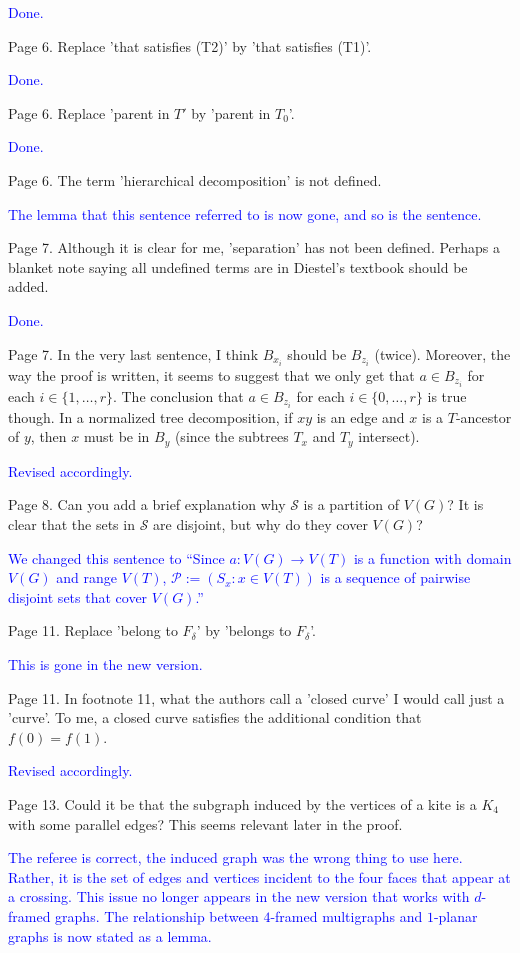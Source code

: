 \documentclass[12pt]{article}
\newcommand{\done}{\textcolor{blue}{Done.}}
\newcommand{\changed}{\textcolor{blue}{Revised accordingly.}}
\begin{document}
\done

Page 6. Replace 'that satisfies (T2)' by 'that satisfies (T1)'.

\done

Page 6. Replace 'parent in $T'$ by 'parent in $T_0$'.

\done

Page 6. The term 'hierarchical decomposition' is not defined.

\textcolor{blue}{The lemma that this sentence referred to is now gone, and so is the sentence.}

Page 7. Although it is clear for me, 'separation' has not been
defined.  Perhaps a blanket note saying all undefined terms are in
Diestel's textbook should be added.

\done

Page 7.  In the very last sentence, I think $B_{x_i}$ should be $B_{z_i}$
(twice).  Moreover, the way the proof is written, it seems to suggest
that we only get that $a \in B_{z_i}$ for each $i \in \{1, \dots, r\}$.
The conclusion that $a \in B_{z_i}$ for each $i \in \{0, \dots, r\}$ is
true though.  In a normalized tree decomposition, if $xy$ is an edge and
$x$ is a $T$-ancestor of $y$, then $x$ must be in $B_y$ (since the subtrees $T_x$
and $T_y$ intersect).

\changed

Page 8.  Can you add a brief explanation why $\mathcal{S}$ is a
partition of $V(G)$?  It is clear that the sets in $\mathcal{S}$ are
disjoint, but why do they cover $V(G)$?

\textcolor{blue}{We changed this sentence to ``Since $a:V(G)\to V(T)$ is a function with domain $V(G)$ and range $V(T)$, $\mathcal{P}:=(S_x : x\in V(T))$ is a sequence of pairwise disjoint sets that cover $V(G)$.''}

Page 11. Replace 'belong to $F_\delta$' by 'belongs to $F_\delta$'.

\textcolor{blue}{This is gone in the new version.}

Page 11. In footnote 11, what the authors call a 'closed curve' I
would call just a 'curve'.  To me, a closed curve satisfies the
additional condition that $f(0)=f(1)$.

\changed

Page 13. Could it be that the subgraph induced by the vertices of a
kite is a $K_4$ with some parallel edges?  This seems relevant later in
the proof.

\textcolor{blue}{The referee is correct, the induced graph was the wrong thing to use here.  Rather, it is the set of edges and vertices incident to the four faces that appear at a crossing.  This issue no longer appears in the new version that works with $d$-framed graphs.  The relationship between $4$-framed multigraphs and $1$-planar graphs is now stated as a lemma.}
\end{document}
